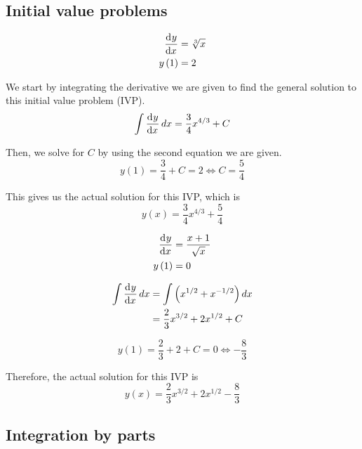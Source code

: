\documentclass[a4paper, titlepage]{article}
\begin{document}
\subsection{Initial value problems}

\begin{Exercise}
    \begin{align*}
        \dod{y}{x} &= \sqrt[3]{x} \\
        y \left( 1 \right) &= 2
    \end{align*}
    \cite{anton-bivens-davis}
\end{Exercise}

\begin{Answer}
    We start by integrating the derivative we are given to find the general solution to this initial value problem (IVP).
    \[\int \dod{y}{x} dx = \frac{3}{4}x^{4/3} + C\]

    Then, we solve for \(C\) by using the second equation we are given.
    \[y \left( 1 \right) = \frac{3}{4} + C = 2 \iff C = \frac{5}{4}\]

    This gives us the actual solution for this IVP, which is
    \[y \left( x \right) = \frac{3}{4}x^{4/3} + \frac{5}{4}\]
\end{Answer}

\begin{Exercise}
    \begin{align*}
        \dod{y}{x} &= \frac{x + 1}{\sqrt{x}} \\
        y \left( 1 \right) &= 0
    \end{align*}
    \cite{anton-bivens-davis}
\end{Exercise}

\begin{Answer}
    \begin{align*}
	    \int \dod{y}{x} dx &= \int \left( x^{1/2} + x^{-1/2} \right) dx \\
	    &= \frac{2}{3}x^{3/2} + 2x^{1/2} + C
    \end{align*}

    \[y \left( 1 \right) = \frac{2}{3} + 2 + C = 0 \iff -\frac{8}{3} \]

    Therefore, the actual solution for this IVP is
    \[y \left( x \right) = \frac{2}{3}x^{3/2} + 2x^{1/2} - \frac{8}{3}\]
\end{Answer}

\subsection{Integration by parts}
\end{document}
